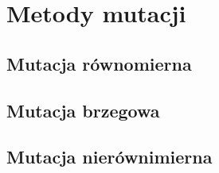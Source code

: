 \chapter{Metody mutacji}\label{cha:pierwszyDokument}


\section{Mutacja równomierna}\label{sec:strukturaDokumentu}


\section{Mutacja brzegowa}\label{sec:kompilacja}


\section{Mutacja nierównimierna}\label{sec:narzedzia}
